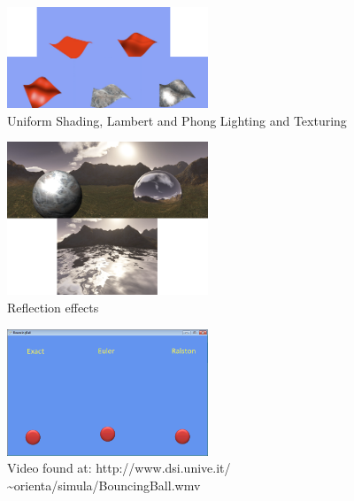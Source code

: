


\begin{figure}
\begin{center}
\includegraphics[width=6cm]{uniform_to_texturedphong.png}
\end{center}
\label{uniform_to_texturedphong}
\caption{Uniform Shading, Lambert and Phong Lighting and Texturing}
\end{figure}


\begin{figure}
\begin{center}
\includegraphics[width=6cm]{reflection_to_water.png}
\end{center}
\label{reflection_to_water}
\caption{Reflection effects}
\end{figure}


\begin{figure}
\begin{center}
\includegraphics[width=6cm]{ralston.png}
\end{center}
\label{ralston}
\caption{Video found at: http://www.dsi.unive.it/ \~{}orienta/simula/BouncingBall.wmv}
\end{figure}